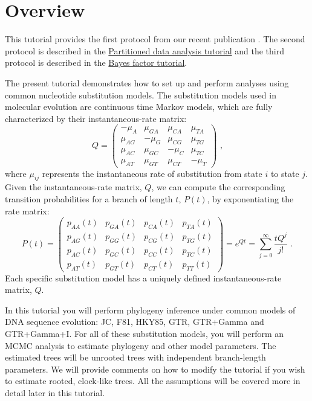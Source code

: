 \section{Overview}

This tutorial provides the first protocol from our recent publication \citep{Hoehna2017a}.
The second protocol is described in the \href{https://github.com/revbayes/revbayes_tutorial/raw/master/tutorial_TeX/RB_Partition_Tutorial/RB_Partition_Tutorial.pdf}{Partitioned data analysis tutorial} and the third protocol is described in the \href{https://github.com/revbayes/revbayes_tutorial/raw/master/tutorial_TeX/RB_BayesFactor_Tutorial/RB_BayesFactor_Tutorial.pdf}{Bayes factor tutorial}.

The present tutorial demonstrates how to set up and perform analyses using common nucleotide substitution models. 
The substitution models used in molecular evolution are continuous time Markov models, which are fully characterized by their instantaneous-rate matrix:
\begin{equation*}
Q = \begin{pmatrix} -\mu_A & \mu_{GA} & \mu_{CA} & \mu_{TA} \\
\mu_{AG} & -\mu_G  & \mu_{CG} & \mu_{TG} \\
\mu_{AC} & \mu_{GC} & -\mu_C  & \mu_{TC} \\
\mu_{AT} & \mu_{GT} & \mu_{CT} & -\mu_T 
\end{pmatrix} \mbox{  ,}
\end{equation*}
where $\mu_{ij}$ represents the instantaneous rate of substitution from state $i$ to state $j$. Given the instantaneous-rate matrix, $Q$, we can compute the corresponding transition probabilities for a branch of length $t$, $P(t)$, by exponentiating the rate matrix:
\begin{equation*}
P(t) = \begin{pmatrix}          
p_{AA}(t) & p_{GA}(t) & p_{CA}(t) & p_{TA}(t) \\
p_{AG}(t) & p_{GG}(t) & p_{CG}(t) & p_{TG}(t) \\
p_{AC}(t) & p_{GC}(t) & p_{CC}(t) & p_{TC}(t) \\
p_{AT}(t) & p_{GT}(t) & p_{CT}(t) & p_{TT}(t)
\end{pmatrix} = e^{Qt} = \sum_{j=0}^\infty\frac{tQ^j}{j!} \mbox{  .}
\end{equation*}
Each specific substitution model has a uniquely defined instantaneous-rate matrix, $Q$.


In this tutorial you will perform phylogeny inference under common models of DNA sequence evolution: JC, F81, HKY85, GTR, GTR+Gamma and GTR+Gamma+I.
For all of these substitution models, you will perform an MCMC analysis to estimate phylogeny and other model parameters.
The estimated trees will be unrooted trees with independent branch-length parameters. 
We will provide comments on how to modify the tutorial if you wish to estimate rooted, clock-like trees.
All the assumptions will be covered more in detail later in this tutorial.

